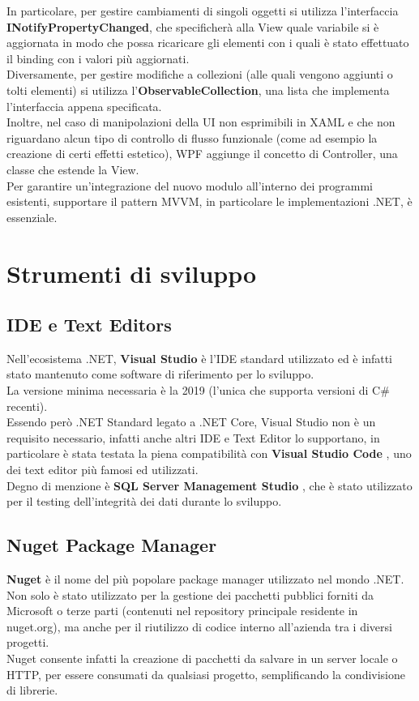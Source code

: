 \documentclass[\main/Tesi.tex]{subfiles}
\begin{document}
In particolare, per gestire cambiamenti di singoli oggetti si utilizza l'interfaccia \textbf{INotifyPropertyChanged}, che specificherà alla View quale variabile si è aggiornata in modo che possa ricaricare gli elementi con i quali è stato effettuato il binding con i valori più aggiornati.\\
Diversamente, per gestire modifiche a collezioni (alle quali vengono aggiunti o tolti elementi) si utilizza l'\textbf{ObservableCollection}, una lista che implementa l'interfaccia appena specificata.\\
Inoltre, nel caso di manipolazioni della UI non esprimibili in XAML e che non riguardano alcun tipo di controllo di flusso funzionale (come ad esempio la creazione di certi effetti estetico), WPF aggiunge il concetto di Controller, una classe che estende la View. \\
Per garantire un'integrazione del nuovo modulo all'interno dei programmi esistenti, supportare il pattern MVVM, in particolare le implementazioni .NET, è essenziale.

\section{Strumenti di sviluppo}

\subsection{IDE e Text Editors}
Nell'ecosistema .NET, \textbf{Visual Studio} è l'IDE standard utilizzato ed è infatti stato mantenuto come software di riferimento per lo sviluppo.\\
La versione minima necessaria è la 2019 (l'unica che supporta versioni di C\# recenti).\\
Essendo però .NET Standard legato a .NET Core, Visual Studio non è un requisito necessario, infatti anche altri IDE e Text Editor lo supportano, in particolare è stata testata la piena compatibilità con \textbf{Visual Studio Code} \cite{vscode}, uno dei text editor più famosi ed utilizzati.\\
Degno di menzione è \textbf{SQL Server Management Studio} \cite{visualstudio}, che è stato utilizzato per il testing dell'integrità dei dati durante lo sviluppo.

\subsection{Nuget Package Manager}
\textbf{Nuget} \cite{nuget} è il nome del più popolare package manager utilizzato nel mondo .NET.\\
Non solo è stato utilizzato per la gestione dei pacchetti pubblici forniti da Microsoft o terze parti (contenuti nel repository principale residente in nuget.org), ma anche per il riutilizzo di codice interno all'azienda tra i diversi progetti.\\
Nuget consente infatti la creazione di pacchetti da salvare in un server locale o HTTP, per essere consumati da qualsiasi progetto, semplificando la condivisione di librerie.\\
\end{document}
